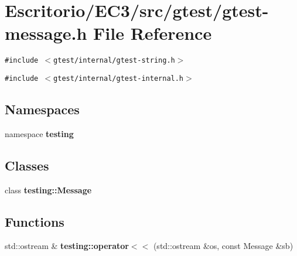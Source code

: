 \section{Escritorio/EC3/src/gtest/gtest-message.h File Reference}
\label{gtest-message_8h}
{\tt \#include $<$gtest/internal/gtest-string.h$>$}\par
{\tt \#include $<$gtest/internal/gtest-internal.h$>$}\par
\subsection*{Namespaces}
\begin{CompactItemize}
\item 
namespace {\bf testing}
\end{CompactItemize}
\subsection*{Classes}
\begin{CompactItemize}
\item 
class {\bf testing::Message}
\end{CompactItemize}
\subsection*{Functions}
\begin{CompactItemize}
\item 
std::ostream \& {\bf testing::operator$<$$<$} (std::ostream \&os, const Message \&sb)
\end{CompactItemize}
